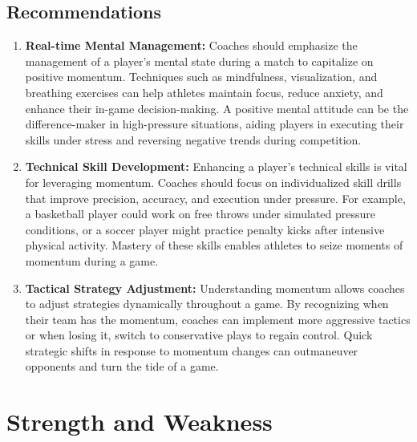 \documentclass[12pt]{article}
\begin{document}
\subsection{Recommendations}
\begin{enumerate}
      \item \textbf{Real-time Mental Management:} Coaches should emphasize the management of a player's mental state during a match to capitalize on positive momentum. Techniques such as mindfulness, visualization, and breathing exercises can help athletes maintain focus, reduce anxiety, and enhance their in-game decision-making. A positive mental attitude can be the difference-maker in high-pressure situations, aiding players in executing their skills under stress and reversing negative trends during competition.
      \item \textbf{Technical Skill Development:} Enhancing a player's technical skills is vital for leveraging momentum. Coaches should focus on individualized skill drills that improve precision, accuracy, and execution under pressure. For example, a basketball player could work on free throws under simulated pressure conditions, or a soccer player might practice penalty kicks after intensive physical activity. Mastery of these skills enables athletes to seize moments of momentum during a game.
      \item \textbf{Tactical Strategy Adjustment:} Understanding momentum allows coaches to adjust strategies dynamically throughout a game. By recognizing when their team has the momentum, coaches can implement more aggressive tactics or when losing it, switch to conservative plays to regain control. Quick strategic shifts in response to momentum changes can outmaneuver opponents and turn the tide of a game.
\end{enumerate}
\section{Strength and Weakness}
\end{document}
